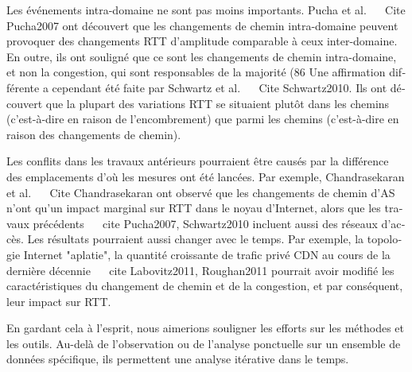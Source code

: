 \begin{otherlanguage}{french}
Les événements intra-domaine ne sont pas moins importants. Pucha et al. ~ \ Cite {Pucha2007} ont découvert que les changements de chemin intra-domaine peuvent provoquer des changements RTT d'amplitude comparable à ceux inter-domaine.
En outre, ils ont souligné que ce sont les changements de chemin intra-domaine, et non la congestion, qui sont responsables de la majorité (86%
Une affirmation différente a cependant été faite par Schwartz et al. ~ \ Cite {Schwartz2010}. Ils ont découvert que la plupart des variations RTT se situaient plutôt dans les chemins (c'est-à-dire en raison de l'encombrement) que parmi les chemins (c'est-à-dire en raison des changements de chemin).

Les conflits dans les travaux antérieurs pourraient être causés par la différence des emplacements d'où les mesures ont été lancées.
Par exemple, Chandrasekaran et al. ~ \ Cite {Chandrasekaran} ont observé que les changements de chemin d'AS n'ont qu'un impact marginal sur RTT dans le noyau d'Internet, alors que les travaux précédents ~ \ cite {Pucha2007, Schwartz2010} incluent aussi des réseaux d'accès.
Les résultats pourraient aussi changer avec le temps. Par exemple, la topologie Internet "aplatie", la quantité croissante de trafic privé CDN au cours de la dernière décennie ~ \ cite {Labovitz2011, Roughan2011} pourrait avoir modifié les caractéristiques du changement de chemin et de la congestion, et par conséquent, leur impact sur RTT.

En gardant cela à l'esprit, nous aimerions souligner les efforts sur les méthodes et les outils.
Au-delà de l'observation ou de l'analyse ponctuelle sur un ensemble de données spécifique, ils permettent une analyse itérative dans le temps.


\end{otherlanguage}
